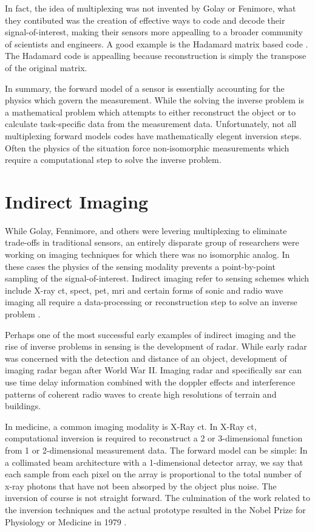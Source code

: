In fact, the idea of multiplexing was not invented by Golay or Fenimore, what they contibuted was the creation of effective ways to code and decode their signal-of-interest, making their sensors more appealling to a broader community of scientists and engineers. A good example is the Hadamard matrix based code \cite{sloane1969codes}. The Hadamard code is appealling because reconstruction is simply the transpose of the original matrix. 

In summary, the forward model of a sensor is essentially accounting for the physics which govern the measurement. While the solving the inverse problem is a mathematical problem which attempts to either reconstruct the object or to calculate task-specific data from the measurement data. Unfortunately, not all multiplexing forward models codes have mathematically elegent inversion steps. Often the physics of the situation force non-isomorphic measurements which require a computational step to solve the inverse problem. 

\section{Indirect Imaging}

While Golay, Fennimore, and others were levering multiplexing to eliminate trade-offs in traditional sensors, an entirely disparate group of researchers were working on imaging techniques for which there was no isomorphic analog. In these cases the physics of the sensing modality prevents a point-by-point sampling of the signal-of-interest. Indirect imaging refer to sensing schemes which include X-ray \gls{ct}, \gls{spect}, \gls{pet}, \gls{mri} and certain forms of sonic and radio wave imaging all require a data-processing or reconstruction step to solve an inverse problem \cite{barrett2013foundations}. 

Perhaps one of the most successful early examples of indirect imaging and the rise of inverse problems in sensing is the development of radar. While early radar was concerned with the detection and distance of an object, development of imaging radar began after World War II. Imaging radar and specifically \gls{sar} can use time delay information combined with the doppler effects and interference patterns of coherent radio waves to create high resolutions of terrain and buildings. 

In medicine, a common imaging modality is X-Ray \gls{ct}. In X-Ray \gls{ct}, computational inversion is required to reconstruct a 2 or 3-dimensional function from 1 or 2-dimensional measurement data. The forward model can be simple: In a collimated beam architecture with a 1-dimensional detector array, we say that each sample from each pixel on the array is proportional to the total number of x-ray photons that have not been absorped by the object \cite{radon20051} plus noise. The inversion of course is not straight forward. The culmination of the work related to the inversion techniques and the actual prototype resulted in the Nobel Prize for Physiology or Medicine in 1979 \cite{nobelprize1979medicine}. 

